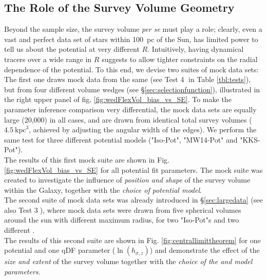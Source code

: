 \subsection{The Role of the Survey Volume Geometry} \label{sec:results_obsvolume}

Beyond the sample size, the survey volume {\it per se} must play a role; clearly, even a vast and perfect data set of stars within 100~pc of the Sun, has limited power to tell us about the potential at very different $R$. Intuitively, having dynamical tracers over a wide range in $R$ suggests to allow tighter constraints on the radial dependence of the potential. To this end, we devise two suites of mock data sets: 
\\The first one draws mock data from the same \pmodel (see Test \textcircled{4} in Table \ref{tbl:tests}), but from four different volume wedges (see \S\ref{sec:selectionfunction}), illustrated in the right upper panel of fig. \ref{fig:wedFlexVol_bias_vs_SE}. To make the parameter inference comparison very differential, the mock data sets are equally large (20,000) in all cases, and are drawn from identical total survey volumes ($4.5~\text{kpc}^3$, achieved by adjusting the angular width of the edges). We perform the same test for three different potential models ("Iso-Pot", "MW14-Pot" and "KKS-Pot").
\\The results of this first mock suite are shown in Fig. \ref{fig:wedFlexVol_bias_vs_SE} for all potential fit parameters. The mock suite was created to investigate the influence of \emph{position and shape} of the survey volume within the Galaxy, together with the \emph{choice of potential model}. 
\\The second suite of mock data sets was already introduced in \S\ref{sec:largedata} (see also Test \textcircled{3}), where mock data sets were drawn from five spherical volumes around the sun with different maximum radius, for two "Iso-Pot"s and two different \MAPs.
\\The results of this second suite are shown in Fig. \ref{fig:centrallimittheorem} for one potential and one qDF parameter ($\ln(h_{\sigma,z})$) and demonstrate the effect of the \emph{size and extent} of the survey volume together with the \emph{choice of the \MAP and model parameters}.

